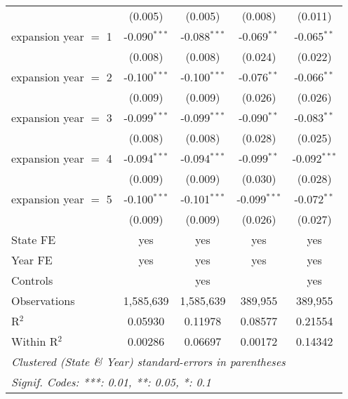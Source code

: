 \documentclass[
]{article}
\let\origtable\table
\let\endorigtable\endtable
\renewenvironment{table}[1][ht]{
      \expandafter\origtable\expandafter[H]
    }{
      \endorigtable
    }
\begin{document}
\begin{table}[htbp]
\begin{tabular}{lcccc}
                            & (0.005)        & (0.005)        & (0.008)        & (0.011)\\   
      expansion year $=$ 1  & -0.090$^{***}$ & -0.088$^{***}$ & -0.069$^{**}$  & -0.065$^{**}$\\   
                            & (0.008)        & (0.008)        & (0.024)        & (0.022)\\   
      expansion year $=$ 2  & -0.100$^{***}$ & -0.100$^{***}$ & -0.076$^{**}$  & -0.066$^{**}$\\   
                            & (0.009)        & (0.009)        & (0.026)        & (0.026)\\   
      expansion year $=$ 3  & -0.099$^{***}$ & -0.099$^{***}$ & -0.090$^{**}$  & -0.083$^{**}$\\   
                            & (0.008)        & (0.008)        & (0.028)        & (0.025)\\   
      expansion year $=$ 4  & -0.094$^{***}$ & -0.094$^{***}$ & -0.099$^{**}$  & -0.092$^{***}$\\   
                            & (0.009)        & (0.009)        & (0.030)        & (0.028)\\   
      expansion year $=$ 5  & -0.100$^{***}$ & -0.101$^{***}$ & -0.099$^{***}$ & -0.072$^{**}$\\   
                            & (0.009)        & (0.009)        & (0.026)        & (0.027)\\   
      State FE              & yes            & yes            & yes            & yes\\  
      Year FE               & yes            & yes            & yes            & yes\\  
      Controls              &                & yes            &                & yes\\  
      Observations          & 1,585,639      & 1,585,639      & 389,955        & 389,955\\  
      R$^2$                 & 0.05930        & 0.11978        & 0.08577        & 0.21554\\  
      Within R$^2$          & 0.00286        & 0.06697        & 0.00172        & 0.14342\\  
      \midrule \midrule
      \multicolumn{5}{l}{\emph{Clustered (State \& Year) standard-errors in parentheses}}\\
      \multicolumn{5}{l}{\emph{Signif. Codes: ***: 0.01, **: 0.05, *: 0.1}}\\
   \end{tabular}
\end{table}
\end{document}
